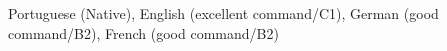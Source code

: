 

\begin{cvskills}


  \cvskill
    {} %
    {Portuguese (Native), English (excellent command/C1), 
    German (good command/B2), French (good command/B2)} %

\end{cvskills}
